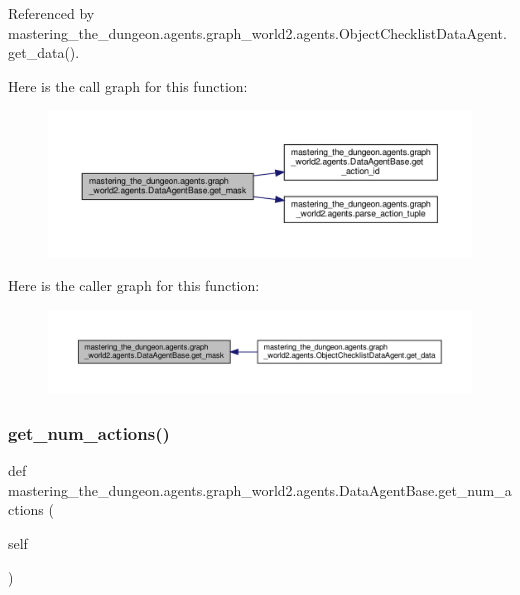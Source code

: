 Referenced by mastering\+\_\+the\+\_\+dungeon.\+agents.\+graph\+\_\+world2.\+agents.\+Object\+Checklist\+Data\+Agent.\+get\+\_\+data().

Here is the call graph for this function\+:
\nopagebreak
\begin{figure}[H]
\begin{center}
\leavevmode
\includegraphics[width=350pt]{classmastering__the__dungeon_1_1agents_1_1graph__world2_1_1agents_1_1DataAgentBase_a2c86aae45d19fdc0bcc72df70398db8d_cgraph}
\end{center}
\end{figure}
Here is the caller graph for this function\+:
\nopagebreak
\begin{figure}[H]
\begin{center}
\leavevmode
\includegraphics[width=350pt]{classmastering__the__dungeon_1_1agents_1_1graph__world2_1_1agents_1_1DataAgentBase_a2c86aae45d19fdc0bcc72df70398db8d_icgraph}
\end{center}
\end{figure}
\mbox{\label{classmastering__the__dungeon_1_1agents_1_1graph__world2_1_1agents_1_1DataAgentBase_ab09548bc8631333116fefdc79d391651}} 
\subsubsection{\texorpdfstring{get\+\_\+num\+\_\+actions()}{get\_num\_actions()}}
{\footnotesize\ttfamily def mastering\+\_\+the\+\_\+dungeon.\+agents.\+graph\+\_\+world2.\+agents.\+Data\+Agent\+Base.\+get\+\_\+num\+\_\+actions (\begin{DoxyParamCaption}\item[{}]{self }\end{DoxyParamCaption})}



